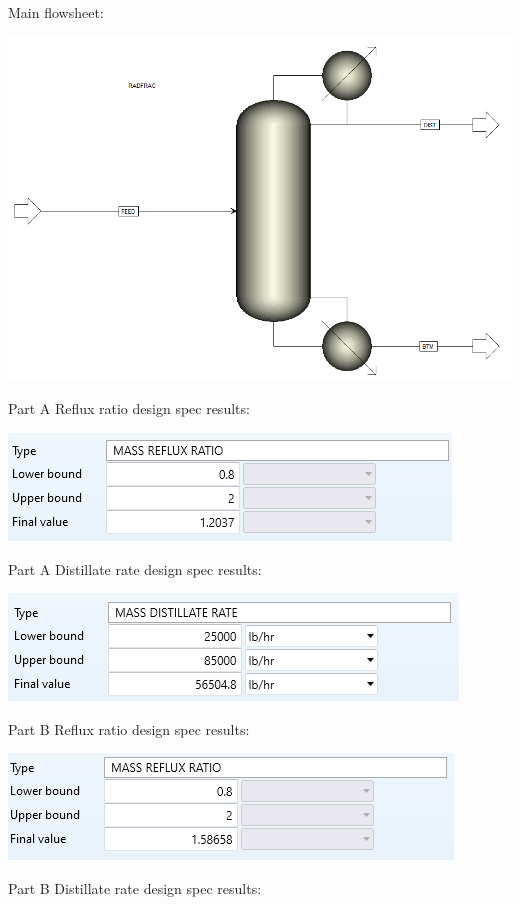 \documentclass[12pt]{article}
\begin{document}
Main flowsheet:
\begin{center}
    \includegraphics[scale=0.5]{main flowsheet.png}
\end{center}
Part A Reflux ratio design spec results:
\begin{center}
    \includegraphics{reflux design spec.png}
\end{center}
Part A Distillate rate design spec results:
\begin{center}
    \includegraphics{distillate rate spec.png}
\end{center}
Part B Reflux ratio design spec results:
\begin{center}
    \includegraphics{reflux design spec B.png}
\end{center}
Part B Distillate rate design spec results:
\end{document}
